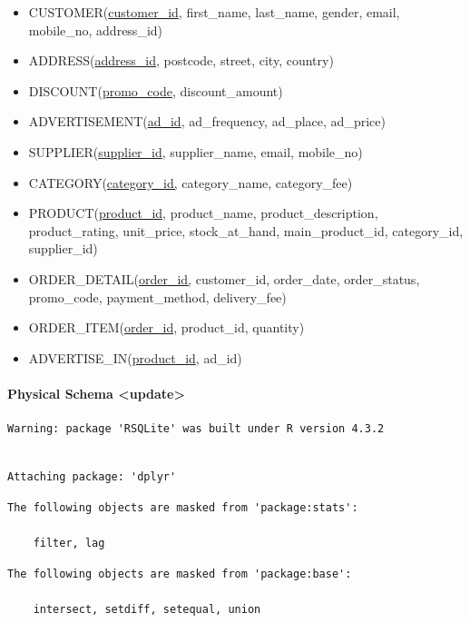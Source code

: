\documentclass[
  letterpaper,
  DIV=11,
  numbers=noendperiod]{scrartcl}
\let\oldparagraph\paragraph
\renewcommand{\paragraph}[1]{\oldparagraph{#1}\mbox{}}
\begin{document}
\begin{itemize}
\item
  CUSTOMER(\ul{customer\_id}, first\_name, last\_name, gender, email,
  mobile\_no, address\_id)
\item
  ADDRESS(\ul{address\_id}, postcode, street, city, country)
\item
  DISCOUNT(\ul{promo\_code}, discount\_amount)
\item
  ADVERTISEMENT(\ul{ad\_id}, ad\_frequency, ad\_place, ad\_price)~
\item
  SUPPLIER(\ul{supplier\_id}, supplier\_name, email, mobile\_no)~
\item
  CATEGORY(\ul{category\_id,} category\_name, category\_fee)
\item
  PRODUCT(\ul{product\_id}, product\_name, product\_description,
  product\_rating, unit\_price, stock\_at\_hand, main\_product\_id,
  category\_id, supplier\_id)~
\item
  ORDER\_DETAIL(\ul{order\_id,} customer\_id, order\_date,
  order\_status, promo\_code, payment\_method, delivery\_fee)
\item
  ORDER\_ITEM(\ul{order\_id}, product\_id, quantity)
\item
  ADVERTISE\_IN(\ul{product\_id}, ad\_id)
\end{itemize}

\hypertarget{physical-schema-update}{%
\paragraph{Physical Schema
\textless update\textgreater{}}\label{physical-schema-update}}

\begin{verbatim}
Warning: package 'RSQLite' was built under R version 4.3.2
\end{verbatim}

\begin{verbatim}

Attaching package: 'dplyr'
\end{verbatim}

\begin{verbatim}
The following objects are masked from 'package:stats':

    filter, lag
\end{verbatim}

\begin{verbatim}
The following objects are masked from 'package:base':

    intersect, setdiff, setequal, union
\end{verbatim}
\end{document}
